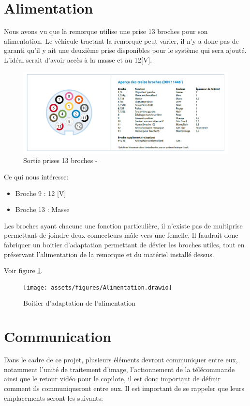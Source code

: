 \section{Alimentation}
Nous avons vu que la remorque utilise une prise 13 broches pour son alimentation. Le véhicule tractant la remorque peut varier, il n'y a donc pas de
garanti qu'il y ait une deuxième prise disponibles pour le système qui sera ajouté. L'idéal serait d'avoir accès à la masse et au 12[V].
\begin{figure}[H]
    \centering
    \includegraphics[width=14cm]{assets/figures/broches.jpg}
    \caption{Sortie prises 13 broches - \cite{prise}}
\end{figure}
Ce qui nous intéresse:
\begin{itemize}
    \item Broche 9  : 12 [V]
    \item Broche 13 : Masse
\end{itemize}
Les broches ayant chacune une fonction particulière, il n'existe pas de multiprise permettant de joindre deux connecteurs mâle vers une femelle.
Il faudrait donc fabriquer un boitier d'adaptation permettant de dévier les broches utiles, tout en préservant l'alimentation de la remorque et du matériel installé dessus.


Voir figure \ref{alim}.
\begin{figure}[h]
    \centering
    \texttt{[image: assets/figures/Alimentation.drawio]}
    \caption{Boitier d'adaptation de l'alimentation \label{alim}}
\end{figure}
\newpage

\section{Communication}
Dans le cadre de ce projet, plusieurs éléments devront communiquer entre eux, notamment l'unité de traitement d'image,
l'actionnement de la télécommande ainsi que le retour vidéo pour le copilote, il est donc important de définir comment ils communiqueront entre eux.
Il est important de se rappeler que leurs emplacements seront les suivants:

